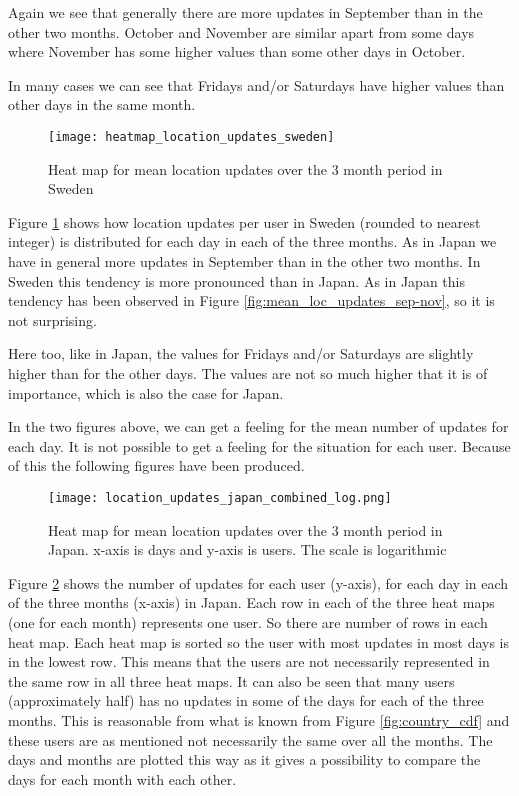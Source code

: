 Again we see that generally there are more updates in September than in the other two months. October and November are similar apart from some days where November has some higher values than some other days in October. 

In many cases we can see that Fridays and/or Saturdays have higher values than other days in the same month. 

\begin{figure}[H]
    \hspace*{-1.5cm}
    \centering
    \texttt{[image: heatmap\_location\_updates\_sweden]}
    \caption{Heat map for mean location updates over the 3 month period in Sweden}
    \label{fig:heatmap_swe}
\end{figure}

Figure \ref{fig:heatmap_swe} shows how location updates per user in Sweden (rounded to nearest integer) is distributed for each day in each of the three months. As in Japan we have in general more updates in September than in the other two months. In Sweden this tendency is more pronounced than in Japan. As in Japan this tendency has been observed in Figure \ref{fig:mean_loc_updates_sep-nov}, so it is not surprising.  
 
Here too, like in Japan, the values for Fridays and/or Saturdays are slightly higher than for the other days. The values are not so much higher that it is of importance, which is also the case for Japan. 

In the two figures above, we can get a feeling for the mean number of updates for each day. It is not possible to get a feeling for the situation for each user. Because of this the following figures have been produced. 

\begin{figure}[H]
    \hspace*{-1.5cm}
    \centering
    \texttt{[image: location\_updates\_japan\_combined\_log.png]}
    \caption{Heat map for mean location updates over the 3 month period in Japan. x-axis is days and y-axis is users. The scale is logarithmic}
    \vspace{-12pt}
    \label{fig:heatmap_japan_combined}
\end{figure}
Figure \ref{fig:heatmap_japan_combined} shows the number of updates for each user (y-axis), for each day in each of the three months (x-axis) in Japan. Each row in each of the three heat maps (one for each month) represents one user. So there are \numberUsersJapan{} number of rows in each heat map.  Each heat map is sorted so the user with most updates in most days is in the lowest row. This means that the users are not necessarily represented in the same row in all three heat maps. It can also be seen that many users (approximately half) has no updates in some of the days for each of the three months. This is reasonable from what is known from Figure \ref{fig:country_cdf} and these users are as mentioned not necessarily the same over all the months. 
The days and months are plotted this way as it gives a possibility to compare the days for each month with each other. 

